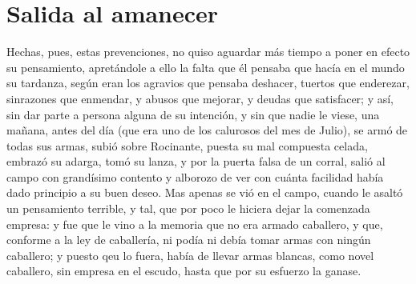 
\thispagestyle{empty}
\chapter{Salida al amanecer}

   Hechas, pues, estas prevenciones, no quiso aguardar más tiempo a
    poner en efecto su pensamiento, apretándole a ello la falta que él
    pensaba que hacía en el mundo su tardanza, según eran los agravios
    que pensaba deshacer, tuertos que enderezar, sinrazones que
    enmendar, y abusos que mejorar, y deudas que satisfacer; y así,
    sin dar parte a persona alguna de su intención, y sin que nadie le
    viese, una mañana, antes del día (que era uno de los calurosos del
    mes de Julio), se armó de todas sus armas, subió sobre Rocinante,
    puesta su mal compuesta celada, embrazó su adarga, tomó su lanza,
    y por la puerta falsa de un corral, salió al campo con grandísimo
    contento y alborozo de ver con cuánta facilidad había dado
    principio a su buen deseo. Mas apenas se vió en el campo, cuando
    le asaltó un pensamiento terrible, y tal, que por poco le hiciera
    dejar la comenzada empresa: y fue que le vino a la memoria que no
    era armado caballero, y que, conforme a la ley de caballería, ni
    podía ni debía tomar armas con ningún caballero; y puesto qeu lo
    fuera, había de llevar armas blancas, como novel caballero, sin
    empresa en el escudo, hasta que por su esfuerzo la ganase.
    
